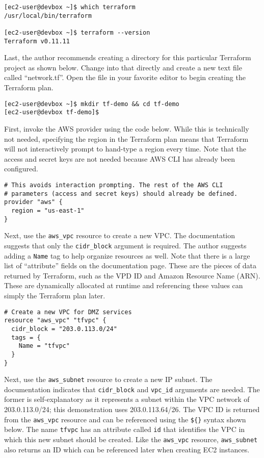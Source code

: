 \begin{verbatim}
[ec2-user@devbox ~]$ which terraform
/usr/local/bin/terraform

[ec2-user@devbox ~]$ terraform --version
Terraform v0.11.11
\end{verbatim}

Last, the author recommends creating a directory for this particular Terraform
project as shown below. Change into that directly and create a new text file
called ``network.tf''. Open the file in your favorite editor to begin creating
the Terraform plan.

\begin{verbatim}
[ec2-user@devbox ~]$ mkdir tf-demo && cd tf-demo
[ec2-user@devbox tf-demo]$
\end{verbatim}

First, invoke the AWS provider using the code below. While this is technically
not needed, specifying the region in the Terraform plan means that Terraform
will not interactively prompt to hand-type a region every time. Note that the
access and secret keys are not needed because AWS CLI has already been configured.

\begin{verbatim}
# This avoids interaction prompting. The rest of the AWS CLI
# parameters (access and secret keys) should already be defined.
provider "aws" {
  region = "us-east-1"
}
\end{verbatim}

Next, use the \verb|aws_vpc| resource to create a new VPC\@. The documentation
suggests that only the \verb|cidr_block| argument is required. The author
suggests adding a \verb|Name| tag to help organize resources as well. Note
that there is a large list of ``attribute'' fields on the documentation page.
These are the pieces of data returned by Terraform, such as the VPD ID and
Amazon Resource Name (ARN). These are dynamically allocated at runtime and
referencing these values can simply the Terraform plan later.

\begin{verbatim}
# Create a new VPC for DMZ services
resource "aws_vpc" "tfvpc" {
  cidr_block = "203.0.113.0/24"
  tags = {
    Name = "tfvpc"
  }
}
\end{verbatim}

Next, use the \verb|aws_subnet| resource to create a new IP subnet. The
documentation indicates that \verb|cidr_block| and \verb|vpc_id| arguments are needed.
The former is self-explanatory as it represents a subnet within the VPC
network of 203.0.113.0/24; this demonstration uses 203.0.113.64/26. The VPC ID
is returned from the \verb|aws_vpc| resource and can be referenced using the \verb|${}|
syntax shown below. The name \verb|tfvpc| has an attribute called \verb|id| that
identifies the VPC in which this new subnet should be created. Like the
\verb|aws_vpc| resource, \verb|aws_subnet| also returns an ID which can be referenced
later when creating EC2 instances.

